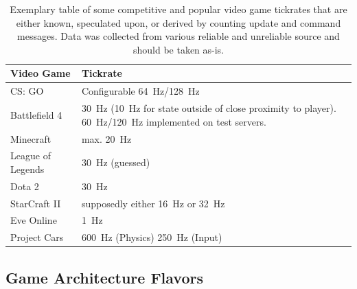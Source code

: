 

\begin{table}[!t]
\caption{Exemplary table of some competitive and popular video game tickrates that are either known, speculated upon, or derived by counting update and command messages. Data was collected from various reliable and unreliable source and should be taken as-is.}
\label{tbl:tickrates}
	\centering
	\begin{tabu}{X[0.45]|X}
		\toprule
		\textbf{Video Game} & \textbf{Tickrate} \\
		\midrule
		CS: GO & Configurable \SI{64}{\hertz}/\SI{128}{\hertz} \\ \midrule
		Battlefield 4 & \SI{30}{\hertz} (\SI{10}{\hertz} for state outside of close proximity to player). \SI{60}{\hertz}/\SI{120}{\hertz} implemented on test servers. \\ \midrule
		Minecraft & max. \SI{20}{\hertz} \\ \midrule
		League of Legends & \SI{30}{\hertz} (guessed) \\ \midrule
		Dota 2 & \SI{30}{\hertz} \\ \midrule
		StarCraft II & supposedly either \SI{16}{\hertz} or \SI{32}{\hertz} \\ \midrule
		Eve Online & \SI{1}{\hertz} \\ \midrule
		Project Cars & \SI{600}{\hertz} (Physics) \SI{250}{\hertz} (Input) \\ %
		\bottomrule
	\end{tabu}
\end{table}


\subsection{Game Architecture Flavors}

